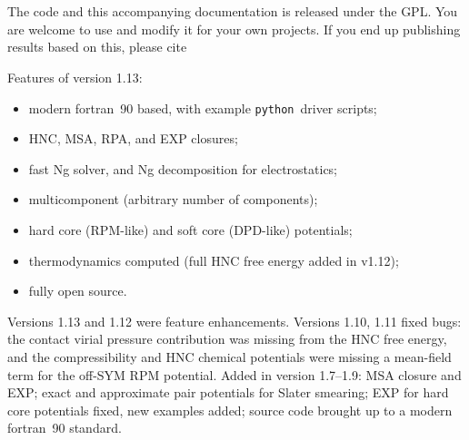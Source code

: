 \documentclass[12pt,a4paper]{article}
\newcommand{\FORTRAN}{{\sc fortran}}
\newcommand{\python}{{\tt python}}
\begin{document}
\\[6pt]
\\[6pt]

\noindent The code and this accompanying documentation is released
under the GPL.  You are welcome to use and modify it for your own
projects. If you end up publishing results based on this, please cite\\
%
\begin{center}
\end{center}

\vspace{0.25in}

\noindent Features of version 1.13:
\begin{itemize}
  \setlength{\itemsep}{1pt}
  \setlength{\parskip}{0pt}
  \setlength{\parsep}{0pt}
\item modern \FORTRAN\ 90 based, with example \python\ driver scripts;
\item HNC, MSA, RPA, and EXP closures;
\item fast Ng solver, and Ng decomposition for electrostatics;
\item multicomponent (arbitrary number of components);
\item hard core (RPM-like) and soft core (DPD-like) potentials;
\item thermodynamics computed (full HNC free energy added in v1.12);
\item fully open source.
\end{itemize}

\noindent
{\small Versions 1.13 and 1.12 were feature enhancements. Versions
  1.10, 1.11 fixed bugs: the contact virial pressure contribution was
  missing from the HNC free energy, and the compressibility and HNC
  chemical potentials were missing a mean-field term for the off-SYM
  RPM potential.  Added in version 1.7--1.9: MSA closure and EXP;
  exact and approximate pair potentials for Slater smearing; EXP for
  hard core potentials fixed, new examples added; source code brought
  up to a modern \FORTRAN\ 90 standard.}

\newpage
{\small\tableofcontents}
\newpage
\end{document}
